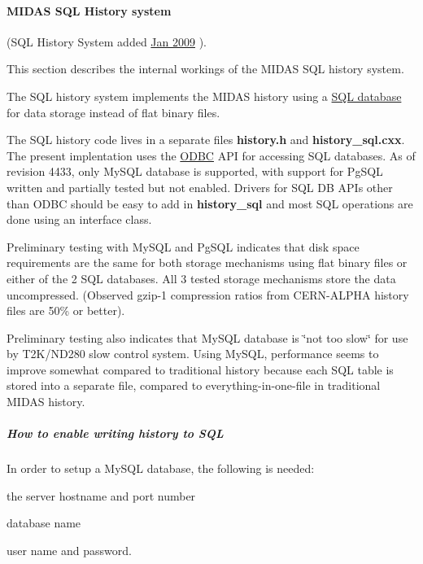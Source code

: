  \label{F_History_logging_idx_ODBC_SQL-history-system}
\hypertarget{F_History_logging_idx_ODBC_SQL-history-system}{}
 \hypertarget{F_History_logging_F_History_sql_internal}{}\paragraph{MIDAS SQL History system}\label{F_History_logging_F_History_sql_internal}
 (SQL History System added \hyperlink{NDF_ndf_jan_2009}{Jan 2009} ).  \par
This section describes the internal workings of the MIDAS SQL history system.

The SQL history system implements the MIDAS history using a \hyperlink{F_mySQL_F_Logger_mySQL}{SQL database} for data storage instead of flat binary files.

The SQL history code lives in a separate files {\bfseries history.h} and {\bfseries history\_\-sql.cxx}. The present implentation uses the \hyperlink{BuildingOptions_BO_HAVE_ODBC}{ODBC} API for accessing SQL databases.  As of revision 4433, only MySQL database is supported, with support for PgSQL written and partially tested but not enabled. Drivers for SQL DB APIs other than ODBC should be easy to add in {\bfseries history\_\-sql} and most SQL operations are done using an interface class.

Preliminary testing with MySQL and PgSQL indicates that disk space requirements are the same for both storage mechanisms using flat binary files or either of the 2 SQL databases. All 3 tested storage mechanisms store the data uncompressed. (Observed gzip-\/1 compression ratios from CERN-\/ALPHA history files are 50\% or better).

\label{F_History_logging_idx_slow-control_MySQL-database}
\hypertarget{F_History_logging_idx_slow-control_MySQL-database}{}
 Preliminary testing also indicates that MySQL database is \char`\"{}not too slow\char`\"{} for use by T2K/ND280 slow control system. Using MySQL, performance seems to improve somewhat compared to traditional history because each SQL table is stored into a separate file, compared to everything-\/in-\/one-\/file in traditional MIDAS history.\hypertarget{F_History_logging_F_History_sql_enable}{}\subparagraph{How to enable writing history to SQL}\label{F_History_logging_F_History_sql_enable}
In order to setup a MySQL database, the following is needed:
\begin{DoxyItemize}
\item the server hostname and port number
\item database name
\item user name and password.
\end{DoxyItemize}

